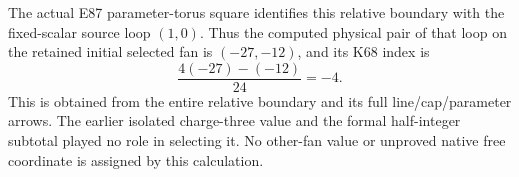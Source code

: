 The actual E87 parameter-torus square identifies this relative boundary with the fixed-scalar source loop \((1,0)\). Thus the computed physical pair of that loop on the retained initial selected fan is \((-27,-12)\), and its K68 index is
\[
                   \frac{4(-27)-(-12)}{24}=-4.
 \tag{E109.7}
\]
This is obtained from the entire relative boundary and its full line/cap/parameter arrows. The earlier isolated charge-three value and the formal half-integer subtotal played no role in selecting it. No other-fan value or unproved native free coordinate is assigned by this calculation.

